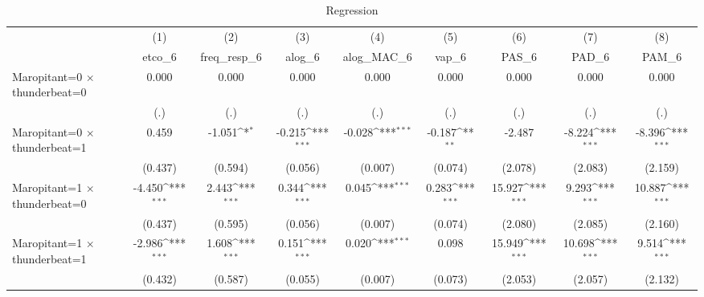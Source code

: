 \begin{table}[htbp]\centering
\def\sym#1{\ifmmode^{#1}\else\(^{#1}\)\fi}
\caption{Regression}
\begin{tabular}{l*{8}{c}}
\toprule
                    &\multicolumn{1}{c}{(1)}&\multicolumn{1}{c}{(2)}&\multicolumn{1}{c}{(3)}&\multicolumn{1}{c}{(4)}&\multicolumn{1}{c}{(5)}&\multicolumn{1}{c}{(6)}&\multicolumn{1}{c}{(7)}&\multicolumn{1}{c}{(8)}\\
                    &\multicolumn{1}{c}{etco\_6}&\multicolumn{1}{c}{freq\_resp\_6}&\multicolumn{1}{c}{alog\_6}&\multicolumn{1}{c}{alog\_MAC\_6}&\multicolumn{1}{c}{vap\_6}&\multicolumn{1}{c}{PAS\_6}&\multicolumn{1}{c}{PAD\_6}&\multicolumn{1}{c}{PAM\_6}\\
\midrule
Maropitant=0 $\times$ thunderbeat=0&       0.000         &       0.000         &       0.000         &       0.000         &       0.000         &       0.000         &       0.000         &       0.000         \\
                    &         (.)         &         (.)         &         (.)         &         (.)         &         (.)         &         (.)         &         (.)         &         (.)         \\
\addlinespace
Maropitant=0 $\times$ thunderbeat=1&       0.459         &      -1.051\sym{*}  &      -0.215\sym{***}&      -0.028\sym{***}&      -0.187\sym{**} &      -2.487         &      -8.224\sym{***}&      -8.396\sym{***}\\
                    &     (0.437)         &     (0.594)         &     (0.056)         &     (0.007)         &     (0.074)         &     (2.078)         &     (2.083)         &     (2.159)         \\
\addlinespace
Maropitant=1 $\times$ thunderbeat=0&      -4.450\sym{***}&       2.443\sym{***}&       0.344\sym{***}&       0.045\sym{***}&       0.283\sym{***}&      15.927\sym{***}&       9.293\sym{***}&      10.887\sym{***}\\
                    &     (0.437)         &     (0.595)         &     (0.056)         &     (0.007)         &     (0.074)         &     (2.080)         &     (2.085)         &     (2.160)         \\
\addlinespace
Maropitant=1 $\times$ thunderbeat=1&      -2.986\sym{***}&       1.608\sym{***}&       0.151\sym{***}&       0.020\sym{***}&       0.098         &      15.949\sym{***}&      10.698\sym{***}&       9.514\sym{***}\\
                    &     (0.432)         &     (0.587)         &     (0.055)         &     (0.007)         &     (0.073)         &     (2.053)         &     (2.057)         &     (2.132)         \\

\end{tabular}
\end{table}
